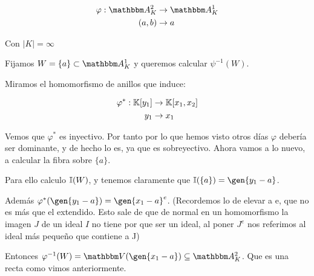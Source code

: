 \begin{example}
	\begin{align*}
	\varphi: \A^2_K & \rightarrow \A^1_K \\
	(a,b) & \rightarrow a
	\end{align*}

	Con $|K|=\infty$

	Fijamos $W=\{a\} \subset \A_K^1$ y queremos calcular $\psi^{-1}(W)$.

	Miramos el homomorfismo de anillos que induce:

	\begin{align*}
	\varphi^*: \mathbb{K}[y_1] & \rightarrow \mathbb{K}[x_1,x_2] \\
	y_1 & \rightarrow x_1
	\end{align*}

	Vemos que $\varphi^*$ es inyectivo. Por tanto por lo que hemos visto otros días $\varphi$ debería ser dominante, y de hecho lo es, ya que es sobreyectivo. Ahora vamos a lo nuevo, a calcular la fibra sobre $\{a\}$.

	Para ello calculo $\mathbb{I}(W)$, y tenemos claramente que $\I(\{a\})=\gen{y_1 -a}$.

	Además $\varphi^*(\gen{y_1-a})=\gen{x_1-a}^e$. (Recordemos lo de elevar a e, que no es más que el extendido. Esto sale de que de normal en un homomorfismo la imagen $J$ de un ideal $I$ no tiene por que ser un ideal, al poner $J^e$ nos referimos al ideal más pequeño que contiene a J)


	Entonces $\varphi^{-1}(W)= \V(\gen{x_1-a}) \subseteq \A^2_K$. Que es una recta como vimos anteriormente.
\end{example}


